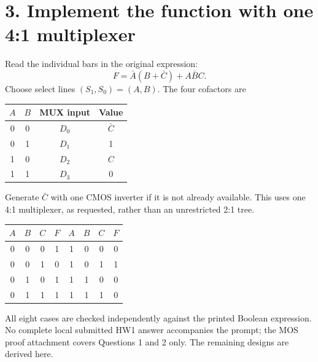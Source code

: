 \documentclass[11pt,a4paper]{article}
\begin{document}
\newpage\section*{3. Implement the function with one 4:1 multiplexer}
Read the individual bars in the original expression:
\[
 \boxed{F=\bar A(B+\bar C)+A\bar BC.}
\]
Choose select lines $(S_1,S_0)=(A,B)$. The four cofactors are
\begin{center}\begin{tabular}{cccc}\toprule
$A$&$B$&MUX input&Value\\\midrule
0&0&$D_0$&$\bar C$\\0&1&$D_1$&1\\
1&0&$D_2$&$C$\\1&1&$D_3$&0\\\bottomrule
\end{tabular}\end{center}
\begin{center}\end{center}
Generate $\bar C$ with one CMOS inverter if it is not already available.
This uses one 4:1 multiplexer, as requested, rather than an unrestricted 2:1 tree.
\begin{center}\begin{tabular}{cccc@{\qquad}cccc}\toprule
$A$&$B$&$C$&$F$&$A$&$B$&$C$&$F$\\\midrule
0&0&0&1&1&0&0&0\\0&0&1&0&1&0&1&1\\
0&1&0&1&1&1&0&0\\0&1&1&1&1&1&1&0\\\bottomrule
\end{tabular}\end{center}
All eight cases are checked independently against the printed Boolean expression.
No complete local submitted HW1 answer accompanies the prompt; the MOS proof
attachment covers Questions 1 and 2 only. The remaining designs are derived here.
\end{document}
